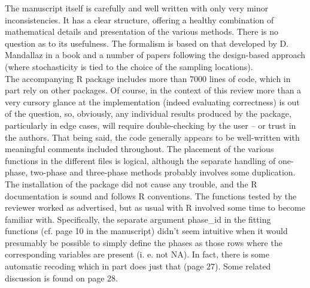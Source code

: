 \documentclass{article}
\begin{document}
The manuscript itself is carefully and well written with only very minor inconsistencies. It has a clear structure, offering a healthy combination of mathematical details and presentation of the various methods. There is no question as to its usefulness. The formalism is based on that developed by D. Mandallaz in a book and a number of papers following the design-based approach (where stochasticity is tied to the choice of the sampling locations).\\

The accompanying R package includes more than 7000 lines of code, which in part rely on other packages. Of course, in the context of this review more than a very cursory glance at the implementation (indeed evaluating correctness) is out of the question, so, obviously, any individual results produced by the package, particularly in edge cases, will require double-checking by the user – or trust in the authors. That being said, the code generally appears to be well-written with meaningful comments included throughout. The placement of the various functions in the different files is logical, although the separate handling of one-phase, two-phase and three-phase methods probably involves some duplication. The installation of the package did not cause any trouble, and the R documentation is sound and follows R conventions. The functions tested by the reviewer worked as advertised, but as usual with R involved some time to become familiar with. Specifically, the separate argument phase\_id in the fitting functions (cf. page 10 in the manuscript) didn't seem intuitive when it would presumably be possible to simply define the phases as those rows where the corresponding variables are present (i. e. not NA). In fact, there is some automatic recoding which in part does just that (page 27). Some related discussion is found on page 28.
\\

\\
\end{document}
